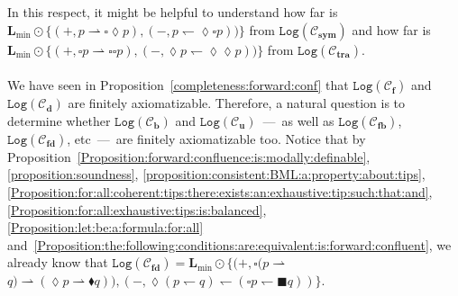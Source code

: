 \documentclass[draft]{article}
\def\bcfra{\mathbf{b}}
\def\fcfra{\mathbf{f}}
\def\fbcfra{\mathbf{fb}}
\def\fdcfra{\mathbf{fd}}
\def\sym{\mathbf{sym}}
\def\transitive{\mathbf{tra}}
\def\dcfra{\mathbf{d}}
\def\ucfra{\mathbf{u}}
\def\Log{\mathtt{Log}}
\def\L{\mathbf{L}}
\begin{document}
In this respect, it might be helpful to understand how far is $\L_{\min}{\odot}\{(+,p{\rightharpoonup}{\square}{\lozenge}p),(-,p{\leftharpoondown}{\lozenge}{\square}p))\}$ from $\Log({\mathcal C}_{\sym})$ and how far is $\L_{\min}{\odot}\{(+,{\square}p{\rightharpoonup}{\square}{\square}p),(-,{\lozenge}p{\leftharpoondown}{\lozenge}{\lozenge}p))\}$ from $\Log({\mathcal C}_{\transitive})$.
%
%
\\
\\
%
%
We have seen in Proposition~\ref{completeness:forward:conf} that $\Log({\mathcal C}_{\fcfra})$ and $\Log({\mathcal C}_{\dcfra})$ are finitely axiomatizable.
Therefore, a natural question is to determine whether $\Log({\mathcal C}_{\bcfra})$ and $\Log({\mathcal C}_{\ucfra})$~---~as well as $\Log({\mathcal C}_{\fbcfra})$, $\Log({\mathcal C}_{\fdcfra})$, etc~---~are finitely axiomatizable too.
Notice that 
by Proposition~\ref{Proposition:forward:confluence:is:modally:definable}, \ref{proposition:soundness}, \ref{proposition:consistent:BML:a:property:about:tips}, \ref{Proposition:for:all:coherent:tips:there:exists:an:exhaustive:tip:such:that:and}, \ref{Proposition:for:all:exhaustive:tips:is:balanced}, \ref{Proposition:let:be:a:formula:for:all} and~\ref{Proposition:the:following:conditions:are:equivalent:is:forward:confluent}, we already know that $\Log({\mathcal C}_{\fdcfra}){=}\L_{\min}{\odot}\{(+,{\square}(p{\rightharpoonup}
%
%
%
%
%
%
%
$\linebreak$
%
%
%
%
%
%
q){\rightharpoonup}({\lozenge}p{\rightharpoonup}{\blacklozenge}q)),(-,{\lozenge}(p{\leftharpoondown}q){\leftharpoondown}({\square}p{\leftharpoondown}{\blacksquare}q))\}$.
%
%
\\
\\
%
%
\end{document}
